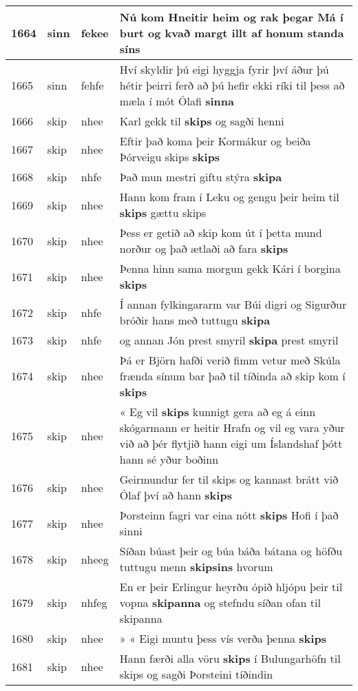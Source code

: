 \documentclass{article}
\begin{document}
\begin{longtable}{p{1cm}|p{1cm}|p{1cm}|p{13cm}}
\hline
1664&sinn&fekee&Nú kom Hneitir heim og rak þegar Má í burt og kvað margt illt af honum standa \textbf{síns} \\
\hline
1665&sinn&fehfe&Hví skyldir þú eigi hyggja fyrir því áður þú hétir þeirri ferð að þú hefir ekki ríki til þess að mæla í mót Ólafi \textbf{sinna} \\
\hline
1666&skip&nhee&Karl gekk til \textbf{skips} og sagði henni\\
\hline
1667&skip&nhee&Eftir það koma þeir Kormákur og beiða Þórveigu skips \textbf{skips} \\
\hline
1668&skip&nhfe&Það mun mestri giftu stýra \textbf{skipa} \\
\hline
1669&skip&nhee&Hann kom fram í Leku og gengu þeir heim til \textbf{skips} gættu skips\\
\hline
1670&skip&nhee&Þess er getið að skip kom út í þetta mund norður og það ætlaði að fara \textbf{skips} \\
\hline
1671&skip&nhee&Þenna hinn sama morgun gekk Kári í borgina \textbf{skips} \\
\hline
1672&skip&nhfe&Í annan fylkingararm var Búi digri og Sigurður bróðir hans með tuttugu \textbf{skipa} \\
\hline
1673&skip&nhfe&og annan Jón prest smyril \textbf{skipa} prest smyril\\
\hline
1674&skip&nhee&Þá er Björn hafði verið fimm vetur með Skúla frænda sínum bar það til tíðinda að skip kom í \textbf{skips} \\
\hline
1675&skip&nhee&« Eg vil \textbf{skips} kunnigt gera að eg á einn skógarmann er heitir Hrafn og vil eg vara yður við að þér flytjið hann eigi um Íslandshaf þótt hann sé yður boðinn\\
\hline
1676&skip&nhee&Geirmundur fer til skips og kannast brátt við Ólaf því að hann \textbf{skips} \\
\hline
1677&skip&nhee&Þorsteinn fagri var eina nótt \textbf{skips} Hofi í það sinni\\
\hline
1678&skip&nheeg&Síðan búast þeir og búa báða bátana og höfðu tuttugu menn \textbf{skipsins} hvorum\\
\hline
1679&skip&nhfeg&En er þeir Erlingur heyrðu ópið hljópu þeir til vopna \textbf{skipanna} og stefndu síðan ofan til skipanna\\
\hline
1680&skip&nhee&» « Eigi muntu þess vís verða þenna \textbf{skips} \\
\hline
1681&skip&nhee&Hann færði alla vöru \textbf{skips} í Bulungarhöfn til skips og sagði Þorsteini tíðindin\\

\end{longtable}
\end{document}
